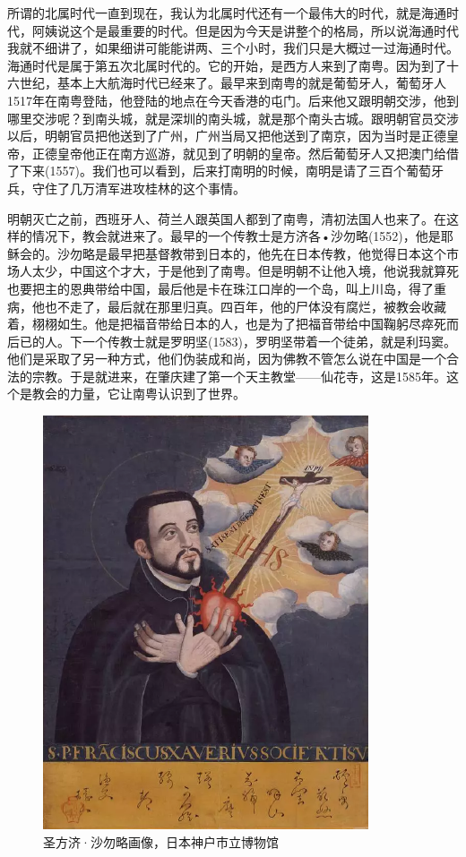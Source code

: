 所谓的北属时代一直到现在，我认为北属时代还有一个最伟大的时代，就是海通时代，阿姨说这个是最重要的时代。但是因为今天是讲整个的格局，所以说海通时代我就不细讲了，如果细讲可能能讲两、三个小时，我们只是大概过一过海通时代。海通时代是属于第五次北属时代的。它的开始，是西方人来到了南粤。因为到了十六世纪，基本上大航海时代已经来了。最早来到南粤的就是葡萄牙人，葡萄牙人1517年在南粤登陆，他登陆的地点在今天香港的屯门。后来他又跟明朝交涉，他到哪里交涉呢？到南头城，就是深圳的南头城，就是那个南头古城。跟明朝官员交涉以后，明朝官员把他送到了广州，广州当局又把他送到了南京，因为当时是正德皇帝，正德皇帝他正在南方巡游，就见到了明朝的皇帝。然后葡萄牙人又把澳门给借了下来(1557)。我们也可以看到，后来打南明的时候，南明是请了三百个葡萄牙兵，守住了几万清军进攻桂林的这个事情。

明朝灭亡之前，西班牙人、荷兰人跟英国人都到了南粤，清初法国人也来了。在这样的情况下，教会就进来了。最早的一个传教士是方济各•沙勿略(1552)，他是耶稣会的。沙勿略是最早把基督教带到日本的，他先在日本传教，他觉得日本这个市场人太少，中国这个才大，于是他到了南粤。但是明朝不让他入境，他说我就算死也要把主的恩典带给中国，最后他是卡在珠江口岸的一个岛，叫上川岛，得了重病，他也不走了，最后就在那里归真。四百年，他的尸体没有腐烂，被教会收藏着，栩栩如生。他是把福音带给日本的人，也是为了把福音带给中国鞠躬尽瘁死而后已的人。下一个传教士就是罗明坚(1583)，罗明坚带着一个徒弟，就是利玛窦。他们是采取了另一种方式，他们伪装成和尚，因为佛教不管怎么说在中国是一个合法的宗教。于是就进来，在肇庆建了第一个天主教堂——仙花寺，这是1585年。这个是教会的力量，它让南粤认识到了世界。

\begin{figure}
	\centering
	\includegraphics[width=\textwidth]{images/image-62}
	\caption{圣方济·沙勿略画像，日本神户市立博物馆}
\end{figure}

